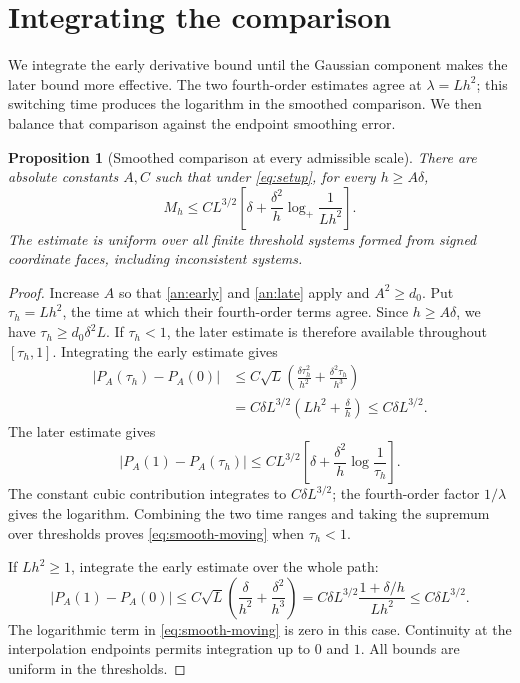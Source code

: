 \documentclass[11pt,letterpaper]{article}
\newtheorem{proposition}{Proposition}
\theoremstyle{remark}
\begin{document}
\section{Integrating the comparison}\label{sec:main-proof}
We integrate the early derivative bound until the Gaussian component
makes the later bound more effective. The two fourth-order estimates
agree at \(\lambda=Lh^2\); this switching time produces the logarithm
in the smoothed comparison. We then balance that comparison against
the endpoint smoothing error.

\begin{proposition}[Smoothed comparison at every admissible scale]
\label{prop:moving-cutoff}
There are absolute constants \(A,C\) such that under \eqref{eq:setup},
for every \(h\ge A\delta\),
\begin{equation}
 M_h\le CL^{3/2}\left[
 \delta+\frac{\delta^2}{h}\log_+\frac1{Lh^2}\right].
 \tag{S*}\label{eq:smooth-moving}
\end{equation}
The estimate is uniform over all finite threshold systems formed from
signed coordinate faces, including inconsistent systems.
\end{proposition}

\begin{proof}
Increase \(A\) so that \eqref{an:early} and \eqref{an:late} apply and
\(A^2\ge d_0\). Put \(\tau_h=Lh^2\), the time at which their
fourth-order terms agree. Since \(h\ge A\delta\), we have
\(\tau_h\ge d_0\delta^2L\). If \(\tau_h<1\), the later estimate
is therefore available throughout \([\tau_h,1]\). Integrating the
early estimate gives
\begin{align*}
 |P_A(\tau_h)-P_A(0)|
 &\le C\sqrt L\left(
 \frac{\delta\tau_h^2}{h^2}
 +\frac{\delta^2\tau_h}{h^3}\right)\\
 &=C\delta L^{3/2}
 \left(Lh^2+\frac\delta h\right)
 \le C\delta L^{3/2}.
\end{align*}
The later estimate gives
\[
 |P_A(1)-P_A(\tau_h)|
 \le CL^{3/2}\left[
 \delta+\frac{\delta^2}{h}\log\frac1{\tau_h}\right].
\]
The constant cubic contribution integrates to \(C\delta L^{3/2}\);
the fourth-order factor \(1/\lambda\) gives the logarithm. Combining
the two time ranges and taking the supremum over thresholds proves
\eqref{eq:smooth-moving} when \(\tau_h<1\).

If \(Lh^2\ge1\), integrate the early estimate over the whole path:
\[
 |P_A(1)-P_A(0)|
 \le C\sqrt L\left(\frac\delta{h^2}
 +\frac{\delta^2}{h^3}\right)
 =C\delta L^{3/2}\frac{1+\delta/h}{Lh^2}
 \le C\delta L^{3/2}.
\]
The logarithmic term in \eqref{eq:smooth-moving} is zero in this case.
Continuity at the interpolation endpoints permits integration up to
\(0\) and \(1\). All bounds are uniform in the thresholds.
\end{proof}
\end{document}

